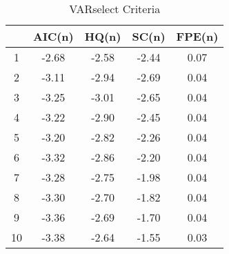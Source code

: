 \begin{table}[ht]
\centering
\caption{VARselect Criteria} 
\label{tab:VARselect}
\begin{tabular}{|c|cccc|}
  \hline
 & AIC(n) & HQ(n) & SC(n) & FPE(n) \\ 
  \hline
1 & -2.68 & -2.58 & -2.44 & 0.07 \\ 
  2 & -3.11 & -2.94 & -2.69 & 0.04 \\ 
  3 & -3.25 & -3.01 & -2.65 & 0.04 \\ 
  4 & -3.22 & -2.90 & -2.45 & 0.04 \\ 
  5 & -3.20 & -2.82 & -2.26 & 0.04 \\ 
  6 & -3.32 & -2.86 & -2.20 & 0.04 \\ 
  7 & -3.28 & -2.75 & -1.98 & 0.04 \\ 
  8 & -3.30 & -2.70 & -1.82 & 0.04 \\ 
  9 & -3.36 & -2.69 & -1.70 & 0.04 \\ 
  10 & -3.38 & -2.64 & -1.55 & 0.03 \\ 
   \hline
\end{tabular}
\end{table}
